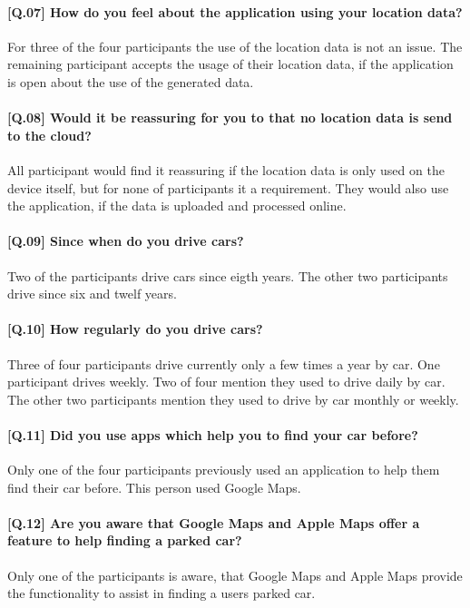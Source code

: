 \paragraph{[Q.07] How do you feel about the application using your location data?}
For three of the four participants the use of the location data is not an issue. The remaining participant accepts the usage of their location data, if the application is open about the use of the generated data. 

\paragraph{[Q.08] Would it be reassuring for you to that no location data is send to the cloud? }
All participant would find it reassuring if the location data is only used on the device itself, but for none of participants it a requirement. They would also use the application, if the data is uploaded and processed online. 

\paragraph{[Q.09] Since when do you drive cars?}
Two of the participants drive cars since eigth years. The other two participants drive since six and twelf years.

\paragraph{[Q.10] How regularly do you drive cars?}
Three of four participants drive currently only a few times a year by car. One participant drives weekly. Two of four mention they used to drive daily by car. The other two participants mention they used to drive by car monthly or weekly. 

\paragraph{[Q.11] Did you use apps which help you to find your car before?}
Only one of the four participants previously used an application to help them find their car before. This person used Google Maps.

\paragraph{[Q.12] Are you aware that Google Maps and Apple Maps offer a feature to help finding a parked car?}
Only one of the participants is aware, that Google Maps and Apple Maps provide the functionality to assist in finding a users parked car. 

